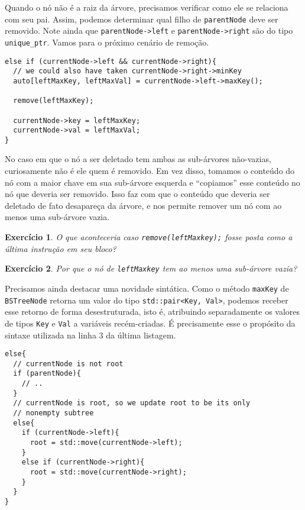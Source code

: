 \documentclass[11pt]{article}
\newtheorem{exercicio}{Exercício}
\begin{document}
Quando o nó não é a raiz da árvore, precisamos verificar como ele
se relaciona com seu pai.  Assim, podemos determinar qual filho de
\texttt{parentNode} deve ser removido.  Note ainda que \texttt{parentNode->left}
e \texttt{parentNode->right} são do tipo \texttt{unique\_ptr}.  Vamos para o
próximo cenário de remoção.

\pagebreak

\begin{verbatim}
else if (currentNode->left && currentNode->right){
  // we could also have taken currentNode->right->minKey
  auto[leftMaxKey, leftMaxVal] = currentNode->left->maxKey();

  remove(leftMaxKey);

  currentNode->key = leftMaxKey;
  currentNode->val = leftMaxVal;
}
\end{verbatim}

No caso em que o nó a ser deletado tem ambas as sub-árvores
não-vazias, curiosamente não é ele quem é removido.  Em vez disso,
tomamos o conteúdo do nó com a maior chave em sua sub-árvore
esquerda e ``copiamos'' esse conteúdo no nó que deveria ser
removido. Isso faz com que o conteúdo que deveria ser deletado de
fato desapareça da árvore, e nos permite remover um nó com ao
menos uma sub-árvore vazia.

\begin{exercicio}
O que aconteceria caso \texttt{remove(leftMaxkey);} fosse posta como a
última instrução em seu bloco?
\end{exercicio}

\begin{exercicio}
Por que o nó de \texttt{leftMaxkey} tem ao menos uma sub-árvore vazia?
\end{exercicio}

Precisamos ainda destacar uma novidade sintática. Como o método
\texttt{maxKey} de \texttt{BSTreeNode} retorna um valor do tipo \texttt{std::pair<Key,
    Val>}, podemos receber esse retorno de forma desestruturada, isto
é, atribuindo separadamente os valores de tipos \texttt{Key} e \texttt{Val} a
variáveis recém-criadas.  É precisamente esse o propósito da
sintaxe utilizada na linha 3 da última
listagem.

\begin{verbatim}
else{
  // currentNode is not root
  if (parentNode){
    // ..
  }
  // currentNode is root, so we update root to be its only
  // nonempty subtree
  else{
    if (currentNode->left){
      root = std::move(currentNode->left);
    }
    else if (currentNode->right){
      root = std::move(currentNode->right);
    }
  }
}
\end{verbatim}
\end{document}
